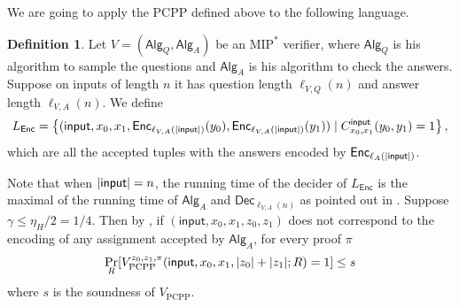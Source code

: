 \documentclass[11pt]{article}
\theoremstyle{plain}
\theoremstyle{definition}
\newtheorem{definition}[theorem]{Definition}
\newcommand {\set} [1] {\ensuremath{ \left\lbrace #1 \right\rbrace }}
\DeclarePairedDelimiter{\abs}{\lvert}{\rvert}
\newcommand{\1}{\mathbb{1}} %
\newcommand{\PCPP}{\mathrm{PCPP}}
\newcommand{\ipt}{\mathsf{input}}
\newcommand{\Enc}{\mathsf{Enc}}
\newcommand{\Dec}{\mathsf{Dec}}
\newcommand{\Alg}{\mathsf{Alg}}
\newcommand{\MIP}{\mathrm{MIP}}
\begin{document}
We are going to apply the $\PCPP$ defined above to the following language.
\begin{definition}
    \label{def:L_enc}
    Let $V = (\Alg_Q, \Alg_A)$ be an $\MIP^\ast$ verifier, where $\Alg_Q$ is his algorithm to sample the questions and $\Alg_A$ is his algorithm to check the answers.
    Suppose on inputs of length $n$ it has question length $\ell_{V,Q}(n)$ and answer length $\ell_{V,A}(n)$.
    We define 
    \begin{align*}
        L_{\Enc} = \set{ (\ipt, x_0, x_1, \Enc_{\ell_{V,A}(\abs{\ipt})}(y_0), \Enc_{\ell_{V,A}(\abs{\ipt})}(y_1) ) 
        \mid C^{\ipt}_{x_0,x_1}(y_0,y_1) = 1
        },
    \end{align*}
    which are all the accepted tuples with the answers encoded by $\Enc_{\ell_A(\abs{\ipt})}$.
\end{definition}
Note that when $\abs{\ipt} = n$, the running time of the decider of $L_{\Enc}$ is the maximal of the running time of $\Alg_A$ and $\Dec_{\ell_{V,A}(n)}$ as pointed out in \cite[Proposition 17.7]{neexp}.
Suppose $\gamma \leq \eta_H/2 = 1/4$. 
Then by \cite[Proposition 17.8]{neexp}, if $(\ipt, x_0, x_1, z_0, z_1)$ does not correspond to 
the encoding of any assignment accepted by $\Alg_A$, for every proof $\pi$
\begin{align*}
    \Pr_R[V_{\PCPP}^{z_0,z_1,\pi}(\ipt, x_0,x_1, \abs{z_0} + \abs{z_1};R) = 1 ] \leq s
\end{align*}
where $s$ is the soundness of $V_{\PCPP}$.
\end{document}
